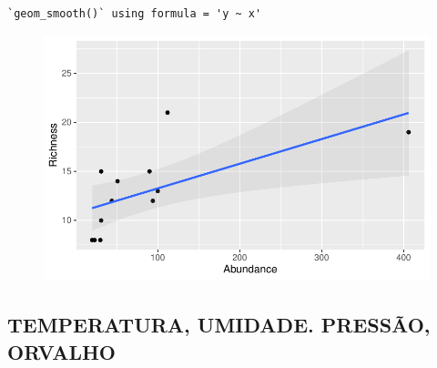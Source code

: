 \documentclass[
  letterpaper,
  DIV=11,
  numbers=noendperiod]{scrartcl}
\begin{document}
\begin{verbatim}
`geom_smooth()` using formula = 'y ~ x'
\end{verbatim}

\begin{figure}[H]

{\centering \includegraphics{report_nmds_files/figure-pdf/unnamed-chunk-5-1.pdf}

}

\end{figure}

\hypertarget{temperatura-umidade.-pressuxe3o-orvalho}{%
\subsection{TEMPERATURA, UMIDADE. PRESSÃO,
ORVALHO}\label{temperatura-umidade.-pressuxe3o-orvalho}}
\end{document}
